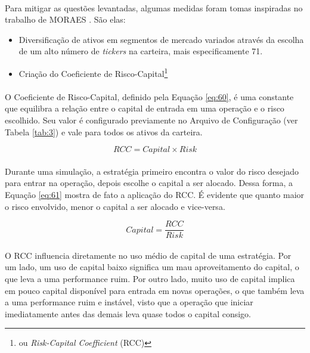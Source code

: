 \paragraph{} Para mitigar as questões levantadas, algumas medidas foram tomas inspiradas no trabalho de MORAES \cite{moraes2007se}. São elas:

\begin{itemize}
    \item Diversificação de ativos em segmentos de mercado variados através da escolha de um alto número de \textit{tickers} na carteira, mais especificamente 71.
    \item Criação do Coeficiente de Risco-Capital\footnote{ou \textit{Risk-Capital Coefficient} (RCC)}
\end{itemize}

\paragraph{} O Coeficiente de Risco-Capital, definido pela Equação \ref{eq:60}, é uma constante que equilibra a relação entre o capital de entrada em uma operação e o risco escolhido. Seu valor é configurado previamente no Arquivo de Configuração (ver Tabela \ref{tab:3}) e vale para todos os ativos da carteira.

\begin{equation} \label{eq:60}
    RCC = Capital \times Risk
\end{equation}

\paragraph{} Durante uma simulação, a estratégia primeiro encontra o valor do risco desejado para entrar na operação, depois escolhe o capital a ser alocado. Dessa forma, a Equação \ref{eq:61} mostra de fato a aplicação do RCC. É evidente que quanto maior o risco envolvido, menor o capital a ser alocado e vice-versa.

\begin{equation} \label{eq:61}
    Capital = \dfrac{RCC}{Risk}
\end{equation}

\paragraph{} O RCC influencia diretamente no uso médio de capital de uma estratégia. Por um lado, um uso de capital baixo significa um mau aproveitamento do capital, o que leva a uma performance ruim. Por outro lado, muito uso de capital implica em pouco capital disponível para entrada em novas operações, o que também leva a uma performance ruim e instável, visto que a operação que iniciar imediatamente antes das demais leva quase todos o capital consigo.

